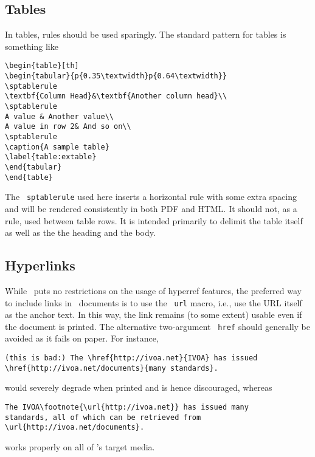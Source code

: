 \documentclass[11pt,a4paper]{ivoa}
\newcommand{\texword}[1]{\texttt{\color{texcolor} #1}}
\begin{document}
\subsection{Tables}

In tables, rules should be used sparingly.  The standard pattern for tables is
something like
\begin{lstlisting}
\begin{table}[th]
\begin{tabular}{p{0.35\textwidth}p{0.64\textwidth}}
\sptablerule
\textbf{Column Head}&\textbf{Another column head}\\
\sptablerule
A value & Another value\\
A value in row 2& And so on\\
\sptablerule
\caption{A sample table}
\label{table:extable}
\end{tabular}
\end{table}
\end{lstlisting}

The \texword{sptablerule} used here inserts a horizontal rule with some
extra spacing and will be rendered consistently in both PDF and HTML.
It should not, as a rule, used between table rows. It is intended
primarily to delimit the table itself as well as the the heading and the
body.

\subsection{Hyperlinks}
\label{sect:links}

While \ivoatex\ puts no restrictions on the usage of hyperref features,
the preferred way to include links in \ivoatex\ documents is to use the
\texword{url} macro, i.e., use the URL itself as the anchor text.  In
this way, the link remains (to some extent) usable even if the document
is printed.  The alternative two-argument \texword{href} should
generally be avoided as it fails on paper.  For instance,
\begin{lstlisting}
(this is bad:) The \href{http://ivoa.net}{IVOA} has issued
\href{http://ivoa.net/documents}{many standards}.
\end{lstlisting}
would severely degrade when printed and is hence discouraged, whereas
\begin{lstlisting}
The IVOA\footnote{\url{http://ivoa.net}} has issued many 
standards, all of which can be retrieved from 
\url{http://ivoa.net/documents}.
\end{lstlisting}
works properly on all of \ivoatex's target media.
\end{document}
